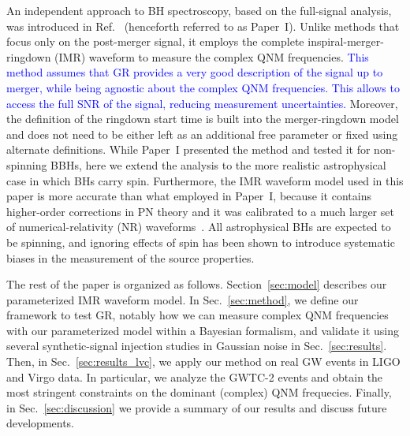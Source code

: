 \documentclass[twocolumn,prd,aps,superscriptaddress,preprintnumbers,tightenlines,showpacs,nofootinbib,eqsecnum,amsfonts,amsmath]{revtex4-1}
\newcommand{\paperone}{Paper~I\xspace}
\newcommand{\rb}[1]{\textcolor{blue}{#1}}
\begin{document}
An independent approach to BH spectroscopy, based on the full-signal
analysis, was introduced in Ref.~\cite{Brito:2018rfr}
(henceforth referred to as \paperone). Unlike methods that focus only
on the post-merger signal, it employs the
complete inspiral-merger-ringdown
(IMR) waveform to measure the complex QNM
frequencies. \rb{This method assumes that GR provides a very good description of the signal up to merger, while being agnostic about the complex QNM frequencies. This allows to access the full SNR of the signal, reducing
measurement uncertainties.} Moreover, the definition of the
ringdown start time is built into the merger-ringdown model and does not need to be
either left as an additional free parameter or fixed using alternate
definitions. While \paperone presented the method and tested it for non-spinning BBHs, here we extend the analysis to the more
realistic astrophysical case in which BHs carry spin. Furthermore,
the IMR waveform model used in this paper is more accurate than what employed in \paperone,
because it contains higher-order corrections in PN theory and it was calibrated to a much larger set
of numerical-relativity (NR) waveforms~\cite{Bohe:2016gbl}. All astrophysical BHs are expected to be spinning,
and ignoring effects of spin has been shown to introduce systematic biases in the measurement of the
source properties.

The rest of the paper is organized as follows. Section~\ref{sec:model} describes our parameterized IMR
waveform model. In Sec.~\ref{sec:method}, we define our framework to test GR, notably how we can measure
complex QNM frequencies with our parameterized model within a Bayesian formalism, and validate it using 
several synthetic-signal injection studies in Gaussian noise in Sec.~\ref{sec:results}. Then, in Sec.~\ref{sec:results_lvc},
we apply our method on real GW events in LIGO and Virgo data. In particular, we analyze
the GWTC-2 events and obtain the most stringent constraints on the dominant (complex) QNM frequecies. Finally, in Sec.~\ref{sec:discussion} we provide a summary of
our results and discuss future developments.




\end{document}
